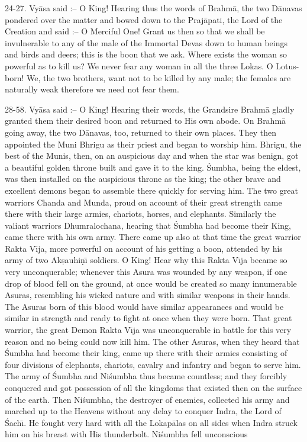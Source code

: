 24-27. Vy\=asa said :-- O King! Hearing thus the words of Brahm\=a, the two D\=anavas pondered over the matter and bowed down to the Praj\=apati, the Lord of the Creation and said :-- O Merciful One! Grant us then so that we shall be invulnerable to any of the male of the Immortal Devas down to human beings and birds and deers; this is the boon that we ask. Where exists the woman so powerful as to kill us? We never fear any woman in all the three Lokas. O Lotus-born! We, the two brothers, want not to be killed by any male; the females are naturally weak therefore we need not fear them.

28-58. Vy\=asa said :-- O King! Hearing their words, the Grandsire Brahm\=a gladly granted them their desired boon and returned to His own abode. On Brahm\=a going away, the two D\=anavas, too, returned to their own places. They then appointed the Muni Bhrigu as their priest and began to worship him. Bhrigu, the best of the Munis, then, on an auspicious day and when the star was benign, got a beautiful golden throne built and gave it to the king. \'Sumbha, being the eldest, was then installed on the auspicious throne as the king; the other brave and excellent demons began to assemble there quickly for serving him. The two great warriors Chanda and Munda, proud on account of their great strength came there with their large armies, chariots, horses, and elephants. Similarly the valiant warriors Dhumralochana, hearing that \'Sumbha had become their King, came there with his own army. There came up also at that time the great warrior Rakta V\={\i}ja, more powerful on account of his getting a boon, attended by his army of two Ak\d{s}auhi\d{n}\={\i} soldiers. O King! Hear why this Rakta V\={\i}ja became so very unconquerable; whenever this Asura was wounded by any weapon, if one drop of blood fell on the ground, at once would be created so many innumerable Asuras, resembling his wicked nature and with similar weapons in their hands. The Asuras born of this blood would have similar appearances and would be similar in strength and ready to fight at once when they were born. That great warrior, the great Demon Rakta V\={\i}ja was unconquerable in battle for this very reason and no being could now kill him. The other Asuras, when they heard that \'Sumbha had become their king, came up there with their armies consisting of four divisions of elephants, chariots, cavalry and infantry and began to serve him. The army of \'Sumbha and Ni\'sumbha thus became countless; and they forcibly conquered and got possession of all the kingdoms that existed then on the surface of the earth. Then Ni\'sumbha, the destroyer of enemies, collected his army and marched up to the Heavens without any delay to conquer Indra, the Lord of \'Sach\={\i}. He fought very hard with all the Lokap\=alas on all sides when Indra struck him on his breast with His thunderbolt. Ni\'sumbha fell unconscious

